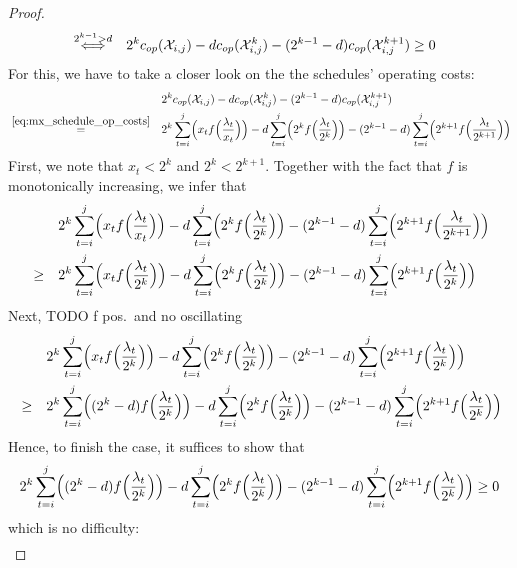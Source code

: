 \begin{proof}
\begin{align*}
	&\stackrel{2^{k-1}>d}{\iff}&2^kc_{op}(\mathcal{X}_{i,j})-dc_{op}(\mathcal{X}_{i,j}^k)-(2^{k-1}-d)c_{op}(\mathcal{X}_{i,j}^{k+1})&\ge 0
\end{align*}
For this, we have to take a closer look on the the schedules' operating costs:
\begin{align*}
	&&&2^kc_{op}(\mathcal{X}_{i,j})-dc_{op}(\mathcal{X}_{i,j}^k)-(2^{k-1}-d)c_{op}(\mathcal{X}_{i,j}^{k+1})\\
	&\stackrel{\eqref{eq:mx_schedule_op_costs}}{=}&&2^k\sum\limits_{t=i}^j\Bigl(x_tf\Bigl(\frac{\lambda_t}{x_t}\Bigr)\Bigr)-d\sum\limits_{t=i}^j\Bigl(2^kf\Bigl(\frac{\lambda_t}{2^k}\Bigr)\Bigr)-(2^{k-1}-d)\sum\limits_{t=i}^j\Bigl(2^{k+1}f\Bigl(\frac{\lambda_t}{2^{k+1}}\Bigr)\Bigr)
\end{align*}
First, we note that $x_t<2^k$ and $2^k<2^{k+1}$. Together with the fact that $f$ is monotonically increasing, we infer that
\begin{align*}
	&&&2^k\sum\limits_{t=i}^j\Bigl(x_tf\Bigl(\frac{\lambda_t}{x_t}\Bigr)\Bigr)-d\sum\limits_{t=i}^j\Bigl(2^kf\Bigl(\frac{\lambda_t}{2^k}\Bigr)\Bigr)-(2^{k-1}-d)\sum\limits_{t=i}^j\Bigl(2^{k+1}f\Bigl(\frac{\lambda_t}{2^{k+1}}\Bigr)\Bigr)\\
	&\ge&&2^k\sum\limits_{t=i}^j\Bigl(x_tf\Bigl(\frac{\lambda_t}{2^k}\Bigr)\Bigr)-d\sum\limits_{t=i}^j\Bigl(2^kf\Bigl(\frac{\lambda_t}{2^k}\Bigr)\Bigr)-(2^{k-1}-d)\sum\limits_{t=i}^j\Bigl(2^{k+1}f\Bigl(\frac{\lambda_t}{2^k}\Bigr)\Bigr)
\end{align*}
Next, TODO f pos.\ and no oscillating
\begin{align*}
	&&&2^k\sum\limits_{t=i}^j\Bigl(x_tf\Bigl(\frac{\lambda_t}{2^k}\Bigr)\Bigr)-d\sum\limits_{t=i}^j\Bigl(2^kf\Bigl(\frac{\lambda_t}{2^k}\Bigr)\Bigr)-(2^{k-1}-d)\sum\limits_{t=i}^j\Bigl(2^{k+1}f\Bigl(\frac{\lambda_t}{2^k}\Bigr)\Bigr)\\
	&\ge&&2^k\sum\limits_{t=i}^j\Bigl((2^k-d)f\Bigl(\frac{\lambda_t}{2^k}\Bigr)\Bigr)-d\sum\limits_{t=i}^j\Bigl(2^kf\Bigl(\frac{\lambda_t}{2^k}\Bigr)\Bigr)-(2^{k-1}-d)\sum\limits_{t=i}^j\Bigl(2^{k+1}f\Bigl(\frac{\lambda_t}{2^k}\Bigr)\Bigr)
\end{align*}
Hence, to finish the case, it suffices to show that
\begin{align*}
	2^k\sum\limits_{t=i}^j\Bigl((2^k-d)f\Bigl(\frac{\lambda_t}{2^k}\Bigr)\Bigr)-d\sum\limits_{t=i}^j\Bigl(2^kf\Bigl(\frac{\lambda_t}{2^k}\Bigr)\Bigr)-(2^{k-1}-d)\sum\limits_{t=i}^j\Bigl(2^{k+1}f\Bigl(\frac{\lambda_t}{2^k}\Bigr)\Bigr)\ge 0
\end{align*}
which is no difficulty:
\begin{align*}

\end{align*}
\end{proof}
